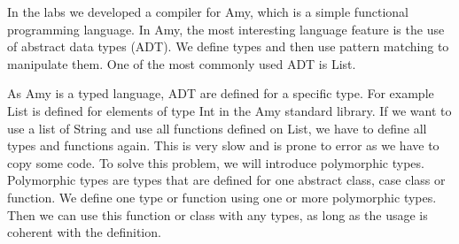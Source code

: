 In the labs we developed a compiler for Amy, which is a simple functional programming language. In Amy, the most interesting language feature is the use of abstract data types (ADT). We define types and then use pattern matching to manipulate them. One of the most commonly used ADT is List. 

As Amy is a typed language, ADT are defined for a specific type. For example List is defined for elements of type Int in the Amy standard library. If we want to use a list of String and use all functions defined on List, we have to define all types and functions again. This is very slow and is prone to error as we have to copy some code. To solve this problem, we will introduce polymorphic types. Polymorphic types are types that are defined for one abstract class, case class or function. We define one type or function using one or more polymorphic types. Then we can use this function or class with any types, as long as the usage is coherent with the definition.
